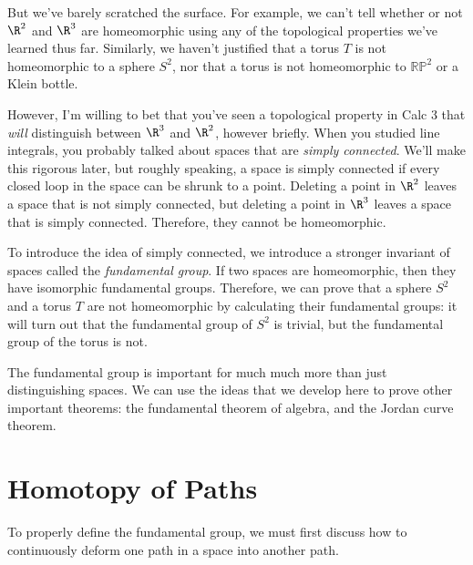 \documentclass[noname]{notes}
\newcommand{\RP}{\mathbb{RP}}
\begin{document}
But we've barely scratched the surface. For example, we can't tell whether or not $\R^2$ and $\R^3$ are homeomorphic using any of the topological properties we've learned thus far. Similarly, we haven't justified that a torus $T$ is not homeomorphic to a sphere $S^2$, nor that a torus is not homeomorphic to $\RP^2$ or a Klein bottle. 

However, I'm willing to bet that you've seen a topological property in Calc 3 that \textit{will} distinguish between $\R^3$ and $\R^2$, however briefly. When you studied line integrals, you probably talked about spaces that are \textit{simply connected}. We'll make this rigorous later, but roughly speaking, a space is simply connected if every closed loop in the space can be shrunk to a point. Deleting a point in $\R^2$ leaves a space that is not simply connected, but deleting a point in $\R^3$ leaves a space that is simply connected. Therefore, they cannot be homeomorphic. 

To introduce the idea of simply connected, we introduce a stronger invariant of spaces called the \textit{fundamental group}. If two spaces are homeomorphic, then they have isomorphic fundamental groups. Therefore, we can prove that a sphere $S^2$ and a torus $T$ are not homeomorphic by calculating their fundamental groups: it will turn out that the fundamental group of $S^2$ is trivial, but the fundamental group of the torus is not. 

The fundamental group is important for much much more than just distinguishing spaces. We can use the ideas that we develop here to prove other important theorems: the fundamental theorem of algebra, and the Jordan curve theorem. 

%
%
%

\section{Homotopy of Paths}

To properly define the fundamental group, we must first discuss how to continuously deform one path in a space into another path. %
\end{document}

